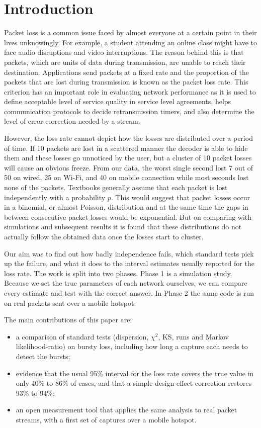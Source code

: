 \documentclass[conference]{IEEEtran}
\begin{document}
\section{Introduction}
Packet loss is a common issue faced by almost everyone at a certain point in their lives unknowingly. For example, a student attending an online class might have to face audio disruptions and video interruptions. The reason behind this is that packets, which are units of data during transmission, are unable to reach their destination. Applications send packets at a fixed rate and the proportion of the packets that are lost during transmission is known as the packet loss rate. This criterion has an important role in evaluating network performance as it is used to define acceptable level of service quality in service level agreements, helps communication protocols to decide retransmission timers, and also determine the level of error correction needed by a stream.

However, the loss rate cannot depict how the losses are distributed over a period of time. If 10 packets are lost in a scattered manner the decoder is able to hide them and these losses go unnoticed by the user, but a cluster of 10 packet losses will cause an obvious freeze. From our data, the worst single second lost 7 out of 50 on wired, 25 on Wi-Fi, and 40 on mobile connection while most seconds lost none of the packets. Textbooks generally assume that each packet is lost independently with a probability $p$. This would suggest that packet losses occur in a binomial, or almost Poisson, distribution and at the same time the gaps in between consecutive packet losses would be exponential. But on comparing with simulations and subsequent results it is found that these distributions do not actually follow the obtained data once the losses start to cluster.

Our aim was to find out how badly independence fails, which standard tests pick up the failure, and what it does to the interval estimates usually reported for the loss rate. The work is split into two phases. Phase 1 is a simulation study. Because we set the true parameters of each network ourselves, we can compare every estimate and test with the correct answer. In Phase 2 the same code is run on real packets sent over a mobile hotspot.

The main contributions of this paper are:
\begin{itemize}
\item a comparison of standard tests (dispersion, $\chi^2$, KS, runs and Markov likelihood-ratio) on bursty loss, including how long a capture each needs to detect the bursts;
\item evidence that the usual 95\% interval for the loss rate covers the true value in only 40\% to 86\% of cases, and that a simple design-effect correction restores 93\% to 94\%;
\item an open measurement tool that applies the same analysis to real packet streams, with a first set of captures over a mobile hotspot.
\end{itemize}
\end{document}
